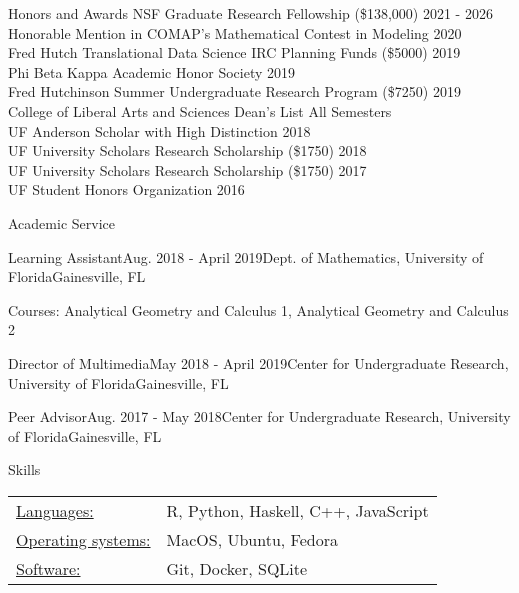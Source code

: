 \documentclass{resume}
\begin{document}
  \begin{rSection}{Honors and Awards}
  NSF Graduate Research Fellowship (\$138,000) \hfill 2021 - 2026 \\
  Honorable Mention in COMAP's Mathematical
  Contest in Modeling \hfill 2020 \\
  Fred Hutch Translational Data Science IRC Planning Funds (\$5000) \hfill 2019 \\
  Phi Beta Kappa Academic Honor Society \hfill 2019 \\
  Fred Hutchinson Summer Undergraduate Research Program (\$7250) \hfill 2019 \\
  College of Liberal Arts and Sciences Dean's List \hfill All Semesters \\
  UF Anderson Scholar with High Distinction \hfill 2018 \\
  UF University Scholars Research Scholarship (\$1750) \hfill 2018 \\
  UF University Scholars Research Scholarship (\$1750) \hfill 2017 \\
  UF Student Honors Organization \hfill 2016 
 \end{rSection}

 
\begin{rSection}{Academic Service}
  
\begin{rSubsection}{Learning Assistant}{Aug. 2018 - April
    2019}{Dept. of Mathematics, University of Florida}{Gainesville,
    FL}
   \item Courses: Analytical Geometry and Calculus 1, Analytical
    Geometry and Calculus 2
  \end{rSubsection}



 \begin{rSubsectionEmpty}{Director of Multimedia}{May 2018 - April 2019}{Center for Undergraduate Research, University of Florida}{Gainesville, FL}
\end{rSubsectionEmpty}


\begin{rSubsectionEmpty}{Peer Advisor}{Aug. 2017 - May 2018}{Center for Undergraduate Research, University of Florida}{Gainesville, FL}
  \end{rSubsectionEmpty}

\end{rSection}
  

\begin{rSection}{Skills}
   \begin{tabular}{l p{3in}}
    \underline{Languages:} & R, Python, Haskell, C++, JavaScript \\
    \underline{Operating systems:} & MacOS, Ubuntu, Fedora \\
     \underline{Software:} & Git, Docker, SQLite
 \end{tabular}
\end{rSection}
\end{document}
